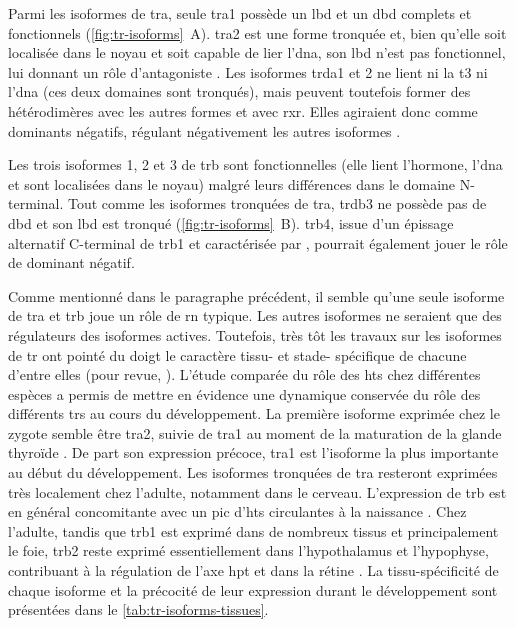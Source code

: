 \documentclass[../main.tex]{subfiles}
\begin{document}
Parmi les isoformes de \gls{tra}, seule \gls{tra}1 possède un \gls{lbd} et un \gls{dbd} complets et fonctionnels (\autoref{fig:tr-isoforms}~A).
\gls{tra}2 est une forme tronquée et, bien qu'elle soit localisée dans le noyau et soit capable de lier l'\gls{dna}, son \gls{lbd} n'est pas fonctionnel, lui donnant un rôle d'antagoniste \citep{Chassande1997}.
Les isoformes \gls{trda}1 et 2 ne lient ni la \gls{t3} ni l'\gls{dna} (ces deux domaines sont tronqués), mais peuvent toutefois former des hétérodimères avec les autres formes et avec \gls{rxr}.
Elles agiraient donc comme dominants négatifs, régulant négativement les autres isoformes \citep{Plateroti2001}.



Les trois isoformes 1, 2 et 3 de \gls{trb} sont fonctionnelles (elle lient l'hormone, l'\gls{dna} et sont localisées dans le noyau) malgré leurs différences dans le domaine N-terminal.
Tout comme les isoformes tronquées de \gls{tra}, \gls{trdb}3 ne possède pas de \gls{dbd} et son \gls{lbd} est tronqué (\autoref{fig:tr-isoforms}~B).
\gls{trb}4, issue d'un épissage alternatif C-terminal de \gls{trb}1 et caractérisée par \citet{Tagami2010}, pourrait également jouer le rôle de dominant négatif.
\par
Comme mentionné dans le paragraphe précédent, il semble qu'une seule isoforme de \gls{tra} et \gls{trb} joue un rôle de \gls{rn} typique.
Les autres isoformes ne seraient que des régulateurs des isoformes actives.
Toutefois, très tôt les travaux sur les isoformes de \gls{tr} ont pointé du doigt le caractère tissu- et stade- spécifique de chacune d'entre elles (pour revue, \citealp{Flamant2003,Cheng2010}).
L'étude comparée du rôle des \glspl{ht} chez différentes espèces a permis de mettre en évidence une dynamique conservée du rôle des différents \glspl{tr} au cours du développement.
La première isoforme exprimée chez le zygote semble être \gls{tra}2, suivie de \gls{tra}1 au moment de la maturation de la glande thyroïde \citep{Strait1991}.
De part son expression précoce, \gls{tra}1 est l'isoforme la plus importante au début du développement.
Les isoformes tronquées de \gls{tra} resteront exprimées très localement chez l'adulte, notamment dans le cerveau.
L'expression de \gls{trb} est en général concomitante avec un pic d'\glspl{ht} circulantes à la naissance \citep{Keijzer2007}.
Chez l'adulte, tandis que \gls{trb}1 est exprimé dans de nombreux tissus et principalement le foie, \gls{trb}2 reste exprimé essentiellement dans l'hypothalamus et l'hypophyse, contribuant à la régulation de l'axe \gls{hpt} \citep{Schwartz1994} et dans la rétine \citep{Abel1999}.
La tissu-spécificité de chaque isoforme et la précocité de leur expression durant le développement sont présentées dans le \autoref{tab:tr-isoforms-tissues}.
\end{document}
